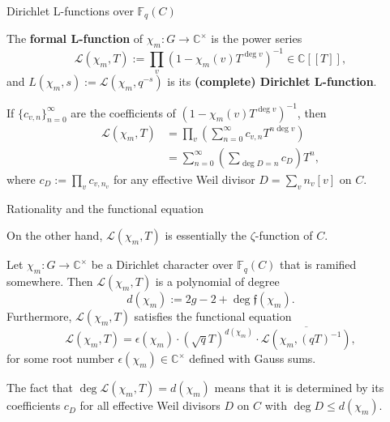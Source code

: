 \documentclass[10pt]{beamer}
\begin{document}
\begin{frame}[t]{Dirichlet L-functions over $ \mathbb{F}_q(C) $}

The \textbf{formal L-function} of $ \chi_m : G \to \mathbb{C}^\times $ is the power series
$$ \mathcal{L}(\chi_m, T) := \prod_v (1 - \chi_m(v)T^{\deg v})^{-1} \in \mathbb{C}[[T]], $$
and $ L(\chi_m, s) := \mathcal{L}(\chi_m, q^{-s}) $ is its \textbf{(complete) Dirichlet L-function}.

\vspace{0.5cm} If $ \{c_{v, n}\}_{n = 0}^\infty $ are the coefficients of $ (1 - \chi_m(v)T^{\deg v})^{-1} $, then
\begin{align*}
\mathcal{L}(\chi_m, T)
& = \prod_v \left(\sum_{n = 0}^\infty c_{v, n}T^{n\deg v}\right) \\
& = \sum_{n = 0}^\infty \left(\sum_{\deg D = n} c_D\right)T^n,
\end{align*}
where $ c_D := \prod_v c_{v, n_v} $ for any effective Weil divisor $ D = \sum_v n_v[v] $ on $ C $.

\end{frame}

\begin{frame}[t]{Rationality and the functional equation}

On the other hand, $ \mathcal{L}(\chi_m, T) $ is essentially the $ \zeta $-function of $ C $.

\vspace{0.5cm}

\begin{corollary}
Let $ \chi_m : G \to \mathbb{C}^\times $ be a Dirichlet character over $ \mathbb{F}_q(C) $ that is ramified somewhere. Then $ \mathcal{L}(\chi_m, T) $ is a polynomial of degree
$$ d(\chi_m) := 2g - 2 + \deg\mathfrak{f}(\chi_m). $$
Furthermore, $ \mathcal{L}(\chi_m, T) $ satisfies the functional equation
$$ \mathcal{L}(\chi_m, T) = \epsilon(\chi_m) \cdot (\sqrt{q}T)^{d(\chi_m)} \cdot \overline{\mathcal{L}(\chi_m, (qT)^{-1})}, $$
for some root number $ \epsilon(\chi_m) \in \mathbb{C}^\times $ defined with Gauss sums.
\end{corollary}

\vspace{0.5cm} The fact that $ \deg\mathcal{L}(\chi_m, T) = d(\chi_m) $ means that it is determined by its coefficients $ c_D $ for all effective Weil divisors $ D $ on $ C $ with $ \deg D \le d(\chi_m) $.

\end{frame}
\end{document}
